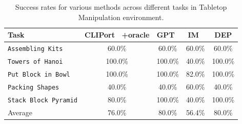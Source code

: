 \begin{table}[H]
\centering
\caption{Success rates for various methods across different tasks in Tabletop Manipulation environment.}
\label{tab:cliport_results}
\renewcommand\arraystretch{1.1}
\begin{tabular}{@{}lcccc@{}}
\toprule
Task & CLIPort~\cite{clipport} +oracle & GPT~\cite{huang2022language} & IM~\cite{innermonologue} & DEP \\ \midrule 
\texttt{Assembling Kits} & 60.0\% & 60.0\% & 60.0\% & 60.0\%  \\
\texttt{Towers of Hanoi}  & 100.0\% & 100.0\% & 40.0\% & 100.0\% \\
\texttt{Put Block in Bowl} & 100.0\% & 100.0\% & 82.0\% & 100.0\% \\
\texttt{Packing Shapes}  & 40.0\%  & 40.0\% & 60.0\% & 40.0\% \\
\texttt{Stack Block Pyramid} & 80.0\%  & 100.0\% & 40.0\% & 100.0\% \\ \midrule
Average & 76.0\% & {\color{red}80.0\%} & 56.4\% & {\color{red}80.0\%} \\ \bottomrule


\end{tabular}
\end{table}
